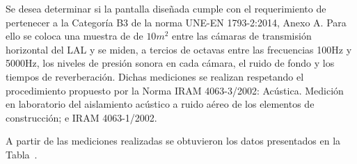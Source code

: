 \par Se desea determinar si la pantalla diseñada cumple con el requerimiento de pertenecer a la Categoría B3 de la norma UNE-EN 1793-2:2014, Anexo A. Para ello se coloca una muestra de de $10 m^2$ entre las cámaras de transmisión horizontal del LAL y se miden, a tercios de octavas entre las frecuencias  100Hz y 5000Hz, los niveles de presión sonora en cada cámara, el ruido de fondo y los tiempos de reverberación. Dichas mediciones se realizan respetando el procedimiento propuesto por la Norma IRAM 4063-3/2002: Acústica. Medición en laboratorio del aislamiento acústico a ruido aéreo de los elementos de construcción; e IRAM 4063-1/2002.

\par A partir de las mediciones realizadas se obtuvieron los datos presentados en la Tabla~.


